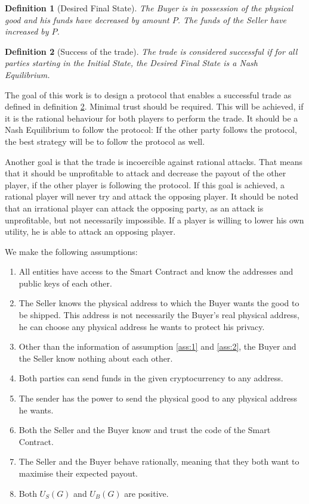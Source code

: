 \documentclass{cacthesis}
\newtheorem{definition}{Definition}
\begin{document}
\begin{definition}[Desired Final State]
\label{def:desired-final-state}
The Buyer is in possession of the physical good and his funds have decreased by amount $P$. The funds of the Seller have increased by $P$.
\end{definition}

\begin{definition}[Success of the trade]
\label{def:success-trade}
The trade is considered successful if for all parties starting in the Initial State, the Desired Final State is a Nash Equilibrium.
\end{definition}

\label{sec:goal}
The goal of this work is to design a protocol that enables a successful trade as defined in definition \ref{def:success-trade}. Minimal trust should be required. This will be achieved, if it is the rational behaviour for both players to perform the trade. It should be a Nash Equilibrium to follow the protocol: If the other party follows the protocol, the best strategy will be to follow the protocol as well.\newline

Another goal is that the trade is incoercible against rational attacks. That means that it should be unprofitable to attack and decrease the payout of the other player, if the other player is following the protocol. If this goal is achieved, a rational player will never try and attack the opposing player. It should be noted that an irrational player can attack the opposing party, as an attack is unprofitable, but not necessarily impossible. If a player is willing to lower his own utility, he is able to attack an opposing player. \newline

We make the following assumptions:
\begin{enumerate}
    \item All entities have access to the Smart Contract and know the addresses and public keys of each other.
    \label{ass:1}
    \item The Seller knows the physical address to which the Buyer wants the good to be shipped. This address is not necessarily the Buyer's real physical address, he can choose any physical address he wants to protect his privacy.
    \label{ass:2}
    \item Other than the information of assumption \ref{ass:1} and \ref{ass:2}, the Buyer and the Seller know nothing about each other.
    \label{ass:3}
    \item Both parties can send funds in the given cryptocurrency to any address.
    \label{ass:4}
    \item The sender has the power to send the physical good to any physical address he wants.
    \label{ass:5}
    \item Both the Seller and the Buyer know and trust the code of the Smart Contract.
    \label{ass:6}
    \item The Seller and the Buyer behave rationally, meaning that they both want to maximise their expected payout.
    \item Both $U_S(G)$ and $U_B(G)$ are positive. 
\end{enumerate}
\end{document}
